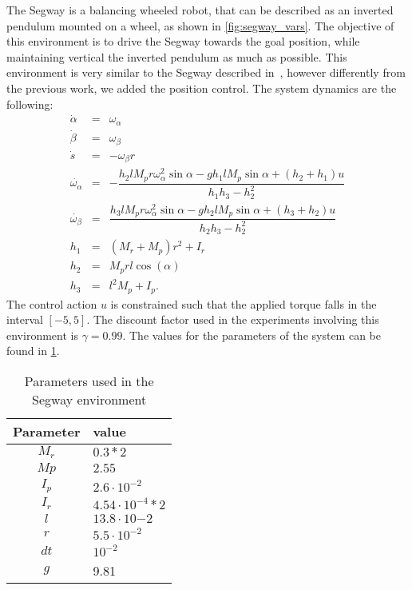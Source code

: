 The Segway is a balancing wheeled robot, that can be described as an inverted pendulum mounted on a wheel, as shown in \cref{fig:segway_vars}. The objective of this environment is to drive the Segway towards the goal position, while maintaining vertical the inverted pendulum as much as possible. This environment is very similar to the Segway described in~\cite{jia2015deep}, however differently from the previous work, we added the position control.
The system dynamics are the following:
\begin{eqnarray*}
\dot{\alpha} & = &\omega_{\alpha} \\
\dot{\beta} & = &\omega_{\beta} \\
\dot{s} & = & -\omega_{\beta}r \\
\dot{\omega_{\alpha}} & = &-\dfrac{h_2 l M_p r\omega_{\alpha}^2\sin\alpha - g h_1 l M_p\sin\alpha + (h_2+h_1)u}{h_1h_3-h_2^2} \\
\dot{\omega_{\beta}} & = &\dfrac{h_3 l M_p r\omega_{\alpha}^2\sin\alpha - g h_2 l M_p\sin\alpha + (h_3+h_2)u}{h_2h_3-h_2^2}\\
h_1 & = & (M_r+M_p)r^2+I_r \\
h_2 & = & M_prl\cos(\alpha) \\
h_3 & = & l^2M_p+I_p.
\end{eqnarray*}
The control action $u$ is constrained such that the applied torque falls in the interval $[-5, 5]$.
The discount factor used in the experiments involving this environment is $\gamma = 0.99$.
The values for the parameters of the system can be found in \cref{tab:segway_parameters}.
\begin{table}[t]
	\centering
	\begin{tabular}{c l}
		\toprule
		Parameter & value\\
		\midrule
		$M_r$ & $0.3*2$ \\
		$Mp$ & $2.55$ \\
		$I_p$ & $2.6\cdot 10^{-2}$ \\
		$I_r$ & $4.54\cdot10^{-4} * 2$ \\
		$l$ & $13.8\cdot 10{-2}$ \\
		$r$ & $5.5\cdot 10^{-2}$ \\
		$dt$ & $10^{-2}$ \\
		$g$ & 9.81 \\
		\bottomrule
	\end{tabular}
	\caption{Parameters used in the Segway environment}
	\label{tab:segway_parameters}
\end{table}

